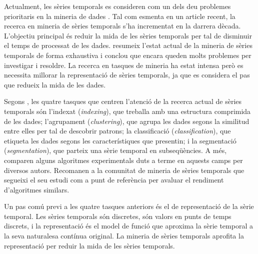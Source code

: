 Actualment, les sèries temporals es consideren com un dels deu problemes
prioritaris en la mineria de dades \parencite{yangwu06}. Tal com
esmenta \textcite{fu11} en un article recent, la recerca en mineria de
sèries temporals s'ha incrementat en la darrera dècada. L'objectiu
principal és reduir la mida de les sèries temporals per tal de
disminuir el temps de processat de les dades.  \citeauthor{fu11}
resumeix l'estat actual de la mineria de sèries temporals de forma
exhaustiva i conclou que encara queden molts problemes per investigar
i resoldre. La recerca en tasques de mineria ha estat intensa però es
necessita millorar la representació de sèries temporals, ja que es
considera el pas que redueix la mida de les dades.

Segons \textcite{keogh02}, les quatre tasques que centren l'atenció de
la recerca actual de sèries temporals són l'indexat (\emph{indexing}),
que treballa amb una estructura comprimida de les dades; l'agrupament
(\emph{clustering}), que agrupa les dades segons la similitud entre
elles per tal de descobrir patrons; la classificació
(\emph{classification}), que etiqueta les dades segons les
característiques que presentin; i la segmentació
(\emph{segmentation}), que parteix una sèrie temporal en
subseqüències.  A més, \citeauthor{keogh02} comparen alguns algoritmes
experimentals duts a terme en aquests camps per diversos
autors. Recomanen a la comunitat de mineria de sèries temporals que
segueixi el seu estudi com a punt de referència per avaluar el
rendiment d'algoritmes similars.



Un pas comú previ a les quatre tasques anteriors és el de
representació de la sèrie temporal. Les sèries temporals són
discretes, són valors en punts de temps discrets, i la representació
és el model de funció que aproxima la sèrie temporal a la seva
naturalesa contínua original. La mineria de sèries temporals aprofita
la representació per reduir la mida de les sèries temporals. 



